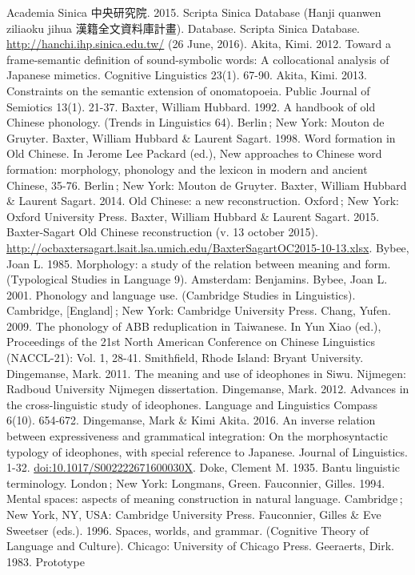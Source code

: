 \documentclass[12pt,article,oneside]{memoir}
\theoremstyle{definition}
\theoremstyle{definition}
\theoremstyle{definition}
\theoremstyle{remark}
\begin{document}
Academia Sinica 中央研究院. 2015. Scripta Sinica Database (Hanji quanwen
ziliaoku jihua 漢籍全文資料庫計畫). Database. Scripta Sinica Database.
\url{http://hanchi.ihp.sinica.edu.tw/} (26 June, 2016). Akita, Kimi.
2012. Toward a frame-semantic definition of sound-symbolic words: A
collocational analysis of Japanese mimetics. Cognitive Linguistics
23(1). 67-90. Akita, Kimi. 2013. Constraints on the semantic extension
of onomatopoeia. Public Journal of Semiotics 13(1). 21-37. Baxter,
William Hubbard. 1992. A handbook of old Chinese phonology. (Trends in
Linguistics 64). Berlin\,; New York: Mouton de Gruyter. Baxter, William
Hubbard \& Laurent Sagart. 1998. Word formation in Old Chinese. In
Jerome Lee Packard (ed.), New approaches to Chinese word formation:
morphology, phonology and the lexicon in modern and ancient Chinese,
35-76. Berlin\,; New York: Mouton de Gruyter. Baxter, William Hubbard \&
Laurent Sagart. 2014. Old Chinese: a new reconstruction. Oxford\,; New
York: Oxford University Press. Baxter, William Hubbard \& Laurent
Sagart. 2015. Baxter-Sagart Old Chinese reconstruction (v. 13 october
2015).
\url{http://ocbaxtersagart.lsait.lsa.umich.edu/BaxterSagartOC2015-10-13.xlsx}.
Bybee, Joan L. 1985. Morphology: a study of the relation between meaning
and form. (Typological Studies in Language 9). Amsterdam: Benjamins.
Bybee, Joan L. 2001. Phonology and language use. (Cambridge Studies in
Linguistics). Cambridge, {[}England{]}\,; New York: Cambridge University
Press. Chang, Yufen. 2009. The phonology of ABB reduplication in
Taiwanese. In Yun Xiao (ed.), Proceedings of the 21st North American
Conference on Chinese Linguistics (NACCL-21): Vol. 1, 28-41. Smithfield,
Rhode Island: Bryant University. Dingemanse, Mark. 2011. The meaning and
use of ideophones in Siwu. Nijmegen: Radboud University Nijmegen
dissertation. Dingemanse, Mark. 2012. Advances in the cross-linguistic
study of ideophones. Language and Linguistics Compass 6(10). 654-672.
Dingemanse, Mark \& Kimi Akita. 2016. An inverse relation between
expressiveness and grammatical integration: On the morphosyntactic
typology of ideophones, with special reference to Japanese. Journal of
Linguistics. 1-32. \url{doi:10.1017/S002222671600030X}. Doke, Clement M.
1935. Bantu linguistic terminology. London\,; New York: Longmans, Green.
Fauconnier, Gilles. 1994. Mental spaces: aspects of meaning construction
in natural language. Cambridge\,; New York, NY, USA: Cambridge
University Press. Fauconnier, Gilles \& Eve Sweetser (eds.). 1996.
Spaces, worlds, and grammar. (Cognitive Theory of Language and Culture).
Chicago: University of Chicago Press. Geeraerts, Dirk. 1983. Prototype
\end{document}
